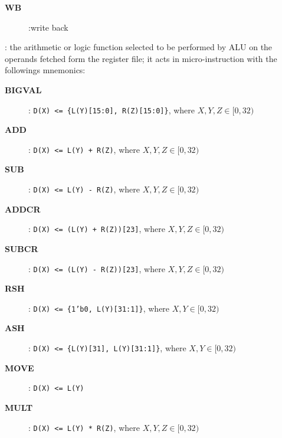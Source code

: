 \begin{description}
        \begin{description}
            \item[{\bf WB}]:write back
        \end{description}
    \item[{\tt aluFunc[3:0]}]: the arithmetic or logic function selected to be performed by ALU on the operands fetched form the register file; it acts in micro-instruction with the followings mnemonics:
        \begin{description}
            \item[{\bf BIGVAL}]: {\tt D(X) <= \{L(Y)[15:0], R(Z)[15:0]\}}, where $X,Y,Z \in [0,32)$
        \end{description}
        \begin{description}
            \item[{\bf ADD}]: {\tt D(X) <= L(Y) + R(Z)}, where $X,Y,Z \in [0,32)$
        \end{description}
        \begin{description}
            \item[{\bf SUB}]: {\tt D(X) <= L(Y) - R(Z)}, where $X,Y,Z \in [0,32)$
        \end{description}
        \begin{description}
            \item[{\bf ADDCR}]: {\tt D(X) <= (L(Y) + R(Z))[23]}, where $X,Y,Z \in [0,32)$
        \end{description}
        \begin{description}
            \item[{\bf SUBCR}]: {\tt D(X) <= (L(Y) - R(Z))[23]}, where $X,Y,Z \in [0,32)$
        \end{description}
        \begin{description}
            \item[{\bf RSH}]: {\tt D(X) <= \{1'b0, L(Y)[31:1]\}}, where $X,Y \in [0,32)$
        \end{description}
        \begin{description}
            \item[{\bf ASH}]: {\tt D(X) <= \{L(Y)[31], L(Y)[31:1]\}}, where $X,Y \in [0,32)$
        \end{description}
        \begin{description}
            \item[{\bf MOVE}]: {\tt D(X) <= L(Y)}
        \end{description}
        \begin{description}
            \item[{\bf MULT}]: {\tt D(X) <= L(Y) * R(Z)}, where $X,Y,Z \in [0,32)$

\end{description}
\end{description}
